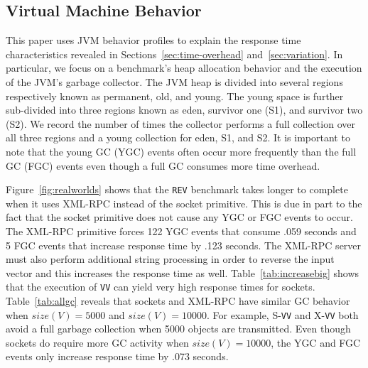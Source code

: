 \documentclass{sig-alternate}
\begin{document}



\subsection{Virtual Machine Behavior}
\label{sec:virt-mach-behav}


This paper uses JVM behavior profiles to explain the response time
characteristics revealed in Sections~\ref{sec:time-overhead}
and~\ref{sec:variation}.  In particular, we focus on a benchmark's
heap allocation behavior and the execution of the JVM's garbage
collector.  The JVM heap is divided into several regions respectively
known as permanent, old, and young.  The young space is further
sub-divided into three regions known as eden, survivor one (S1), and
survivor two (S2).  We record the number of times the collector
performs a full collection over all three regions and a young
collection for eden, S1, and S2.  It is important to note that the
young GC (YGC) events often occur more frequently than the full GC
(FGC) events even though a full GC consumes more time overhead.



Figure~\ref{fig:realworlds} shows that the {\tt REV} benchmark takes
longer to complete when it uses XML-RPC instead of the socket
primitive.  This is due in part to the fact that the socket primitive
does not cause any YGC or FGC events to occur.  The XML-RPC primitive
forces 122 YGC events that consume .059 seconds and 5 FGC events that
increase response time by .123 seconds.  The XML-RPC server must also
perform additional string processing in order to reverse the input
vector and this increases the response time as well.
Table~\ref{tab:increasebig} shows that the execution of {\tt VV} can
yield very high response times for sockets.  Table~\ref{tab:allgc}
reveals that sockets and XML-RPC have similar GC behavior when
$size(V)=5000$ and $size(V)=10000$.  For example, S-{\tt VV} and
X-{\tt VV} both avoid a full garbage collection when 5000 objects are
transmitted.  Even though sockets do require more GC activity when
$size(V)=10000$, the YGC and FGC events only increase response time by
.073 seconds.
\end{document}
